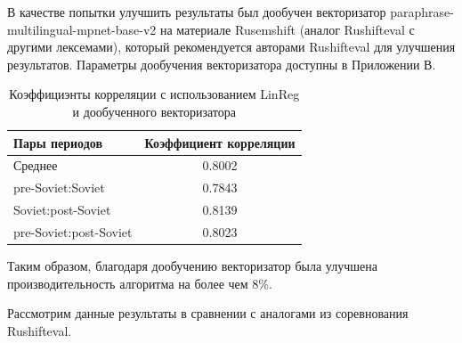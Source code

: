 \documentclass[LI,VKR]{HSEUniversity}
\begin{document}
В качестве попытки улучшить результаты был дообучен векторизатор paraphrase-multilingual-mpnet-base-v2
на материале Rusemshift (аналог Rushifteval с другими лексемами), который рекомендуется авторами
Rushifteval для улучшения результатов.
Параметры дообучения векторизатора доступны в Приложении В.

\begin{table}[H]
\centering
\caption{Коэффициэнты корреляции с использованием LinReg и дообученного векторизатора}
\begin{tabular}{lc}
\hline
Пары периодов                  & Коэффициент корреляции \\
\hline
Среднее            & 0.8002                  \\
pre-Soviet:Soviet           & 0.7843                  \\
Soviet:post-Soviet          & 0.8139                  \\
pre-Soviet:post-Soviet      & 0.8023                  \\
\hline
\end{tabular}
\end{table}

Таким образом, благодаря дообучению векторизатор была улучшена производительность алгоритма
на более чем 8\%.

Рассмотрим данные результаты в сравнении с аналогами из соревнования Rushifteval.
\end{document}
